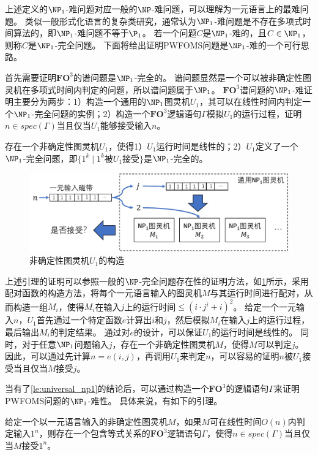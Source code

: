 \documentclass[12pt,UTF8,AutoFakeBold=3,a4paper]{ctexart} %
\newcommand{\sentence}{\Gamma}
\newcommand{\fothree}{\ensuremath{\mathbf{FO}^3}}
\begin{document}
上述定义的$\NP_1$-难问题对应一般的$\NP$-难问题，可以理解为一元语言上的最难问题。
类似一般形式化语言的复杂类研究，通常认为$\NP_1$-难问题是不存在多项式时间算法的，即$\NP_1$-难问题不等于$\P_1$。
若一个问题$C$是$\NP_1$-难的，且$C\in\NP_1$，则称$C$是$\NP_1$-完全问题。
下面将给出证明PWFOMS问题是$\NP_1$-难的一个可行思路。

首先需要证明\fothree{}的谱问题是$\NP_1$-完全的。
谱问题显然是一个可以被非确定性图灵机在多项式时间内判定的问题，所以谱问题属于$\NP_1$。
\fothree{}谱问题的$\NP_1$-难证明主要分为两步：1）构造一个通用的$\NP_1$图灵机$U_1$，其可以在线性时间内判定一个$\NP_1$-完全问题的实例；2）构造一个\fothree{}逻辑语句$\sentence$模拟$U_1$的运行过程，证明$n\in spec(\sentence)$当且仅当$U_1$能够接受输入$n$。

\begin{lemma}\label{le:universal_np1}
  存在一个非确定性图灵机$U_1$，使得1）$U_1$运行时间是线性的；2）$U_1$定义了一个$\NP_1$-完全问题，即$\{1^k\mid 1^k\text{被}U_1\text{接受}\}$是$\NP_1$-完全的。
\end{lemma}

\begin{figure}[tb]
  \centering
  \includegraphics[width=.85\textwidth]{figs/NP1_TM.pdf}
  \caption{非确定性图灵机$U_1$的构造}
  \label{fig:np1_tm}
\end{figure}

上述引理的证明可以参照一般的$\NP$-完全问题存在性的证明方法，如\cref{fig:np1_tm}所示，采用配对函数的构造方法，将每个一元语言输入的图灵机$M$与其运行时间进行配对，从而构造一组$M_i$，使得$M_i$在输入$j$上的运行时间$\leq (i\cdot j^i+i)^2$。
给定一个一元输入$n$，$U_1$首先通过一个特定函数$e$计算出$i$和$j$，然后模拟$M_i$在输入$j$上的运行过程，最后输出$M_i$的判定结果。
通过对$e$的设计，可以保证$U_1$的运行时间是线性的。
同时，对于任意$\NP_1$问题输入$j$，存在一个非确定性图灵机$M$，使得$M$可以判定$j$。
因此，可以通过先计算$n = e(i, j)$，再调用$U_1$来判定$n$，可以容易的证明$n$被$U_1$接受当且仅当$M$接受$j$。

当有了\cref{le:universal_np1}的结论后，可以通过构造一个\fothree{}的逻辑语句$\sentence$来证明PWFOMS问题的$\NP_1$-难性。
具体来说，有如下的引理。
\begin{lemma}\label{le:fo3_turing}
  给定一个以一元语言输入的非确定性图灵机$M$，如果$M$可在线性时间$O(n)$内判定输入$1^n$，则存在一个包含等式关系的\fothree{}逻辑语句$\sentence$，使得$n\in spec(\sentence)$当且仅当$M$接受$1^n$。
\end{lemma}
\end{document}
